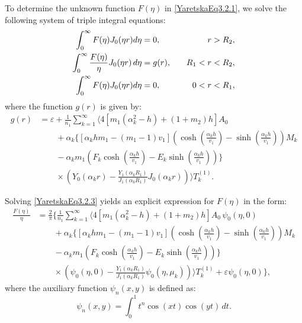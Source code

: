 To determine the unknown function \( F(\eta) \) in \eqref{YaretskaEq3.2.1}, we solve the following system of triple integral equations:
\begin{align}
	\int_0^\infty F(\eta) J_0(\eta r) d\eta &= 0, & \quad r > R_2, \notag \\
	\int_0^\infty \frac{F(\eta)}{\eta} J_0(\eta r) \, d\eta &= g(r), & \quad R_1 < r < R_2, \label{YaretskaEq3.2.3} \\
	\int_0^\infty F(\eta) J_0(\eta r) d\eta &= 0, & \quad 0 < r < R_1, \notag
\end{align}
where the function \( g(r) \) is given by:
\begin{equation*} 
	\begin{aligned}
		g(r) &= \varepsilon + \frac{1}{n_1} \sum_{k=1}^\infty \Bigg\langle
		 4 \left[ m_1 (\alpha_k^2 - h) + (1 + m_2) h \right] A_0 \\
		&\qquad + \alpha_k \bigg\{
		\left[ \alpha_k h m_1 - (m_1 - 1) v_1 \right]
		\left( \cosh\left( \frac{\alpha_k h}{v_1} \right) - \sinh\left( \frac{\alpha_k h}{v_1} \right) \right) M_k 
		 \\
		& \qquad - \alpha_k m_1 \left( F_k \cosh\left( \frac{\alpha_k h}{v_1} \right) - E_k \sinh\left( \frac{\alpha_k h}{v_1} \right) \right)
		\bigg\} \\
		&  \qquad \times \left( Y_0(\alpha_k r) - \frac{Y_1(\alpha_k R_1)}{J_1(\alpha_k R_1)} J_0(\alpha_k r) \right)
		\Bigg\rangle T_k^{(1)}.
	\end{aligned}
\end{equation*}

Solving \eqref{YaretskaEq3.2.3} yields an explicit expression for \( F(\eta) \) in the form:
\begin{equation*}
	\begin{aligned}
		\frac{F(\eta)}{\eta} &= \frac{2}{\pi} \Bigg\{
		 \frac{1}{n_1} \sum_{k=1}^\infty \Bigg\langle
		4 \left[ m_1 (\alpha_k^2 - h) + (1 + m_2) h \right] A_0 \, \psi_0(\eta, 0) \\
		& \qquad+ \alpha_k \bigg\{
		\left[ \alpha_k h m_1 - (m_1 - 1) v_1 \right]
		\left( \cosh\left( \frac{\alpha_k h}{v_1} \right) - \sinh\left( \frac{\alpha_k h}{v_1} \right) \right) M_k  
		\\
		&  \qquad - \alpha_k m_1 \left( F_k \cosh\left( \frac{\alpha_k h}{v_1} \right) - E_k \sinh\left( \frac{\alpha_k h}{v_1} \right) \right)
		\bigg\} \\
		& \qquad \times \left( \psi_0(\eta, 0) - \frac{Y_1(\alpha_k R_1)}{J_1(\alpha_k R_1)} \psi_0(\eta, \mu_k) \right)
		\Bigg\rangle T_k^{(1)} + \varepsilon \psi_0(\eta, 0)
		\Bigg\},
	\end{aligned}
\end{equation*}
where the auxiliary function \( \psi_n(x, y) \) is defined as:
\begin{equation*} 
	\psi_n(x, y) = \int_0^1 t^n \cos(xt) \cos(yt) \, dt.
\end{equation*}


